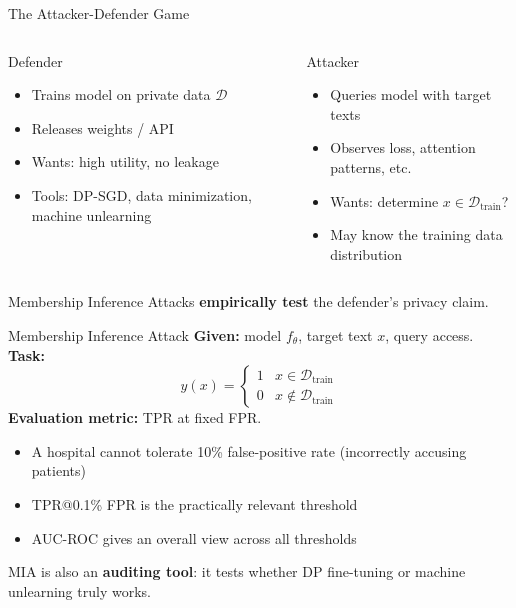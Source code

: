 \documentclass[10pt, aspectratio=169]{beamer}
\begin{document}
\begin{frame}{The Attacker-Defender Game}
  \begin{columns}[T]
    \begin{block}{Defender}
      \begin{itemize}
        \item Trains model on private data $\mathcal{D}$
        \item Releases weights / API
        \item Wants: high utility, no leakage
        \item Tools: DP-SGD, data minimization, machine unlearning
      \end{itemize}
    \end{block}
    \begin{alertblock}{Attacker}
      \begin{itemize}
        \item Queries model with target texts
        \item Observes loss, attention patterns, etc.
        \item Wants: determine $x \in \mathcal{D}_{\mathrm{train}}$?
        \item May know the training data distribution
      \end{itemize}
    \end{alertblock}
  \end{columns}
  \vspace{10pt}
  Membership Inference Attacks \textbf{empirically test} the defender's privacy claim.
\end{frame}

\begin{frame}{Membership Inference Attack}
  \textbf{Given:} model $f_\theta$, target text $x$, query access.\\[8pt]
  \textbf{Task:}
  \[
    \hat{y}(x) = \begin{cases} 1 & x \in \mathcal{D}_{\mathrm{train}} \\ 0 & x \notin \mathcal{D}_{\mathrm{train}} \end{cases}
  \]
  \textbf{Evaluation metric:} TPR at fixed FPR.
  \begin{itemize}
    \item A hospital cannot tolerate 10\% false-positive rate (incorrectly accusing patients)
    \item TPR@0.1\% FPR is the practically relevant threshold
    \item AUC-ROC gives an overall view across all thresholds
  \end{itemize}
  \vspace{8pt}
  MIA is also an \textbf{auditing tool}: it tests whether DP fine-tuning or machine unlearning truly works.
\end{frame}
\end{document}
